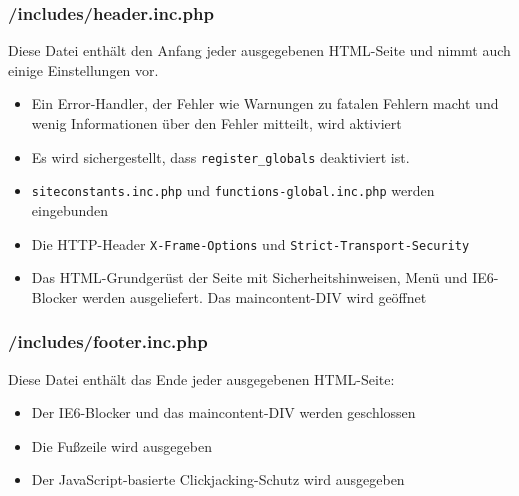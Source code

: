 \documentclass[parskip=half]{scrartcl}
\begin{document}
\subsubsection{/includes/header.inc.php}
Diese Datei enthält den Anfang jeder ausgegebenen HTML-Seite und nimmt auch einige Einstellungen vor.
\begin{itemize}
	\item Ein Error-Handler, der Fehler wie Warnungen zu fatalen Fehlern macht und wenig Informationen über den Fehler mitteilt, wird aktiviert
	\item Es wird sichergestellt, dass \texttt{register\_globals} deaktiviert ist.
	\item \texttt{siteconstants.inc.php} und \texttt{functions-global.inc.php} werden eingebunden
	\item Die HTTP-Header \texttt{X-Frame-Options} und \texttt{Strict-Transport-Security}
	\item Das HTML-Grundgerüst der Seite mit Sicherheitshinweisen, Menü und IE6-Blocker werden ausgeliefert. Das maincontent-DIV wird geöffnet
\end{itemize}

\subsubsection{/includes/footer.inc.php}
Diese Datei enthält das Ende jeder ausgegebenen HTML-Seite:
\begin{itemize}
	\item Der IE6-Blocker und das maincontent-DIV werden geschlossen
	\item Die Fußzeile wird ausgegeben
	\item Der JavaScript-basierte Clickjacking-Schutz wird ausgegeben
\end{itemize}
\end{document}
